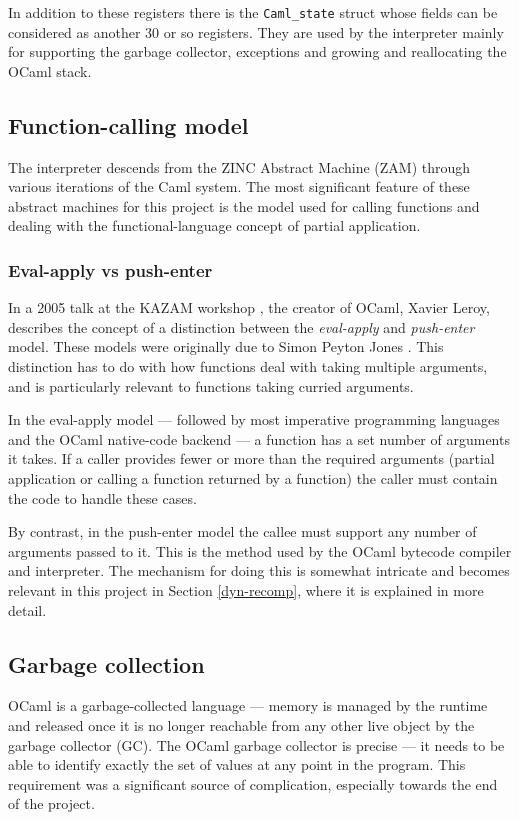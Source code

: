 In addition to these registers there is the \texttt{Caml\_state} struct whose fields can be
considered as another 30 or so registers. They are used by the interpreter mainly for supporting
the garbage collector, exceptions and growing and reallocating the OCaml stack.

\subsection{Function-calling model}

The interpreter descends from the ZINC Abstract Machine (ZAM) \cite{zinc} through various
iterations of the Caml system. The most significant feature of these abstract machines for this
project is the model used for calling functions and dealing with the functional-language concept
of partial application.

\subsubsection{Eval-apply vs push-enter}

In a 2005 talk at the KAZAM workshop \cite{xavtalk}, the creator of OCaml, Xavier Leroy, describes
the concept of a distinction between the \emph{eval-apply} and \emph{push-enter} model.
These models were originally due to Simon Peyton Jones \cite{jones}\cite{marlow-jones}. This
distinction has to do with how functions deal with taking multiple arguments, and is particularly
relevant to functions taking curried arguments.

In the eval-apply model --- followed by most imperative programming languages and the OCaml
native-code backend --- a function has a set number of arguments it takes. If a caller provides
fewer or more than the required arguments (partial application or calling a function returned by a
function) the caller must contain the code to handle these cases.

By contrast, in the push-enter model the callee must support any number of arguments passed to it.
This is the method used by the OCaml bytecode compiler and interpreter. The mechanism for doing
this is somewhat intricate and becomes relevant in this project in Section \ref{dyn-recomp}, where
it is explained in more detail.

\subsection{Garbage collection}

OCaml is a garbage-collected language --- memory is managed by the runtime and released once it is
no longer reachable from any other live object by the garbage collector (GC). The OCaml garbage
collector is precise --- it needs to be able to identify exactly the set of values at any point in
the program. This requirement was a significant source of complication, especially towards the end
of the project.

